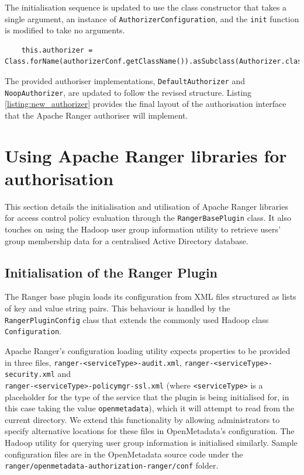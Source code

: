 The initialisation sequence is updated to use the class constructor that takes a single argument, an instance of \texttt{AuthorizerConfiguration}, and the \texttt{init} function is modified to take no arguments.

\begin{verbatim}
    this.authorizer = Class.forName(authorizerConf.getClassName()).asSubclass(Authorizer.class).getConstructor(AuthorizerConfiguration.class).newInstance(authorizerConf);
\end{verbatim}

The provided authoriser implementations, \texttt{DefaultAuthorizer} and \texttt{NoopAuthorizer}, are updated to follow the revised structure. Listing \ref{listing:new_authorizer} provides the final layout of the authorisation interface that the Apache Ranger authoriser will implement.

\section{\label{sec:using_apache_ranger_for_authorisation} Using Apache Ranger libraries for authorisation}

This section details the initialisation and utilisation of Apache Ranger libraries for access control policy evaluation through the \texttt{RangerBasePlugin} class. It also touches on using the Hadoop user group information utility to retrieve users' group membership data for a centralised Active Directory database.

\subsection{Initialisation of the Ranger Plugin}

The Ranger base plugin loads its configuration from XML files structured as lists of key and value string pairs. This behaviour is handled by the \texttt{RangerPluginConfig} class that extends the commonly used Hadoop class \texttt{Configuration}.

Apache Ranger's configuration loading utility expects properties to be provided in three files, \texttt{ranger-<serviceType>-audit.xml}, \texttt{ranger-<serviceType>-security.xml} and\\ \texttt{ranger-<serviceType>-policymgr-ssl.xml} (where \texttt{<serviceType>} is a placeholder for the type of the service that the plugin is being initialised for, in this case taking the value \texttt{openmetadata}), which it will attempt to read from the current directory. We extend this functionality by allowing administrators to specify alternative locations for these files in OpenMetadata's configuration. The Hadoop utility for querying user group information is initialised similarly. Sample configuration files are in the OpenMetadata source code under the \texttt{ranger/openmetadata-authorization-ranger/conf} folder.

